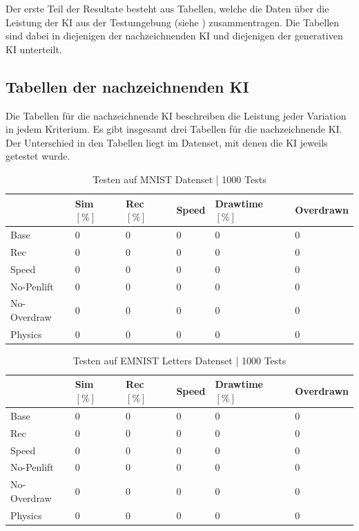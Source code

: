 Der erste Teil der Resultate besteht aus Tabellen, welche die Daten über die
Leistung der KI aus der Testumgebung (siehe )
zusammentragen. Die Tabellen sind dabei in diejenigen der nachzeichnenden KI und
diejenigen der generativen KI unterteilt.

\subsection{Tabellen der nachzeichnenden KI}\label{sub:r_tab_nachzeich}
Die Tabellen für die nachzeichnende KI beschreiben die Leistung jeder Variation
in jedem Kriterium. Es gibt insgesamt drei Tabellen für die nachzeichnende KI.
Der Unterschied in den Tabellen liegt im Datenset, mit denen die KI jeweils
getestet wurde.

\begin{table}[!ht]
    \centering
    \caption{Testen auf MNIST Datenset | 1000 Tests}\label{tab:MNIST}
    \begin{tabular}{|l|l|l|l|l|l|}
            \hline
            \hline ~ & Sim $[\%]$ & Rec $[\%]$ & Speed & Drawtime $[\%]$ & Overdrawn \\ \hline
            Base & 0 & 0 & 0 & 0 & 0 \\ \hline
            Rec & 0 & 0 & 0 & 0 & 0 \\ \hline
            Speed & 0 & 0 & 0 & 0 & 0 \\ \hline
            No-Penlift & 0 & 0 & 0 & 0 & 0 \\ \hline
            No-Overdraw & 0 & 0 & 0 & 0 & 0 \\ \hline
            Physics & 0 & 0 & 0 & 0 & 0 \\ \hline
        \end{tabular}
\end{table}

\begin{table}[!ht]
    \centering
    \caption{Testen auf EMNIST Letters Datenset | 1000 Tests}\label{tab:EMNIST}
    \begin{tabular}{|l|l|l|l|l|l|}
        \hline ~ & Sim $[\%]$ & Rec $[\%]$ & Speed & Drawtime $[\%]$ & Overdrawn \\ \hline
        Base & 0 & 0 & 0 & 0 & 0 \\ \hline
        Rec & 0 & 0 & 0 & 0 & 0 \\ \hline
        Speed & 0 & 0 & 0 & 0 & 0 \\ \hline
        No-Penlift & 0 & 0 & 0 & 0 & 0 \\ \hline
        No-Overdraw & 0 & 0 & 0 & 0 & 0 \\ \hline
        Physics & 0 & 0 & 0 & 0 & 0 \\ \hline
    \end{tabular}
\end{table}


